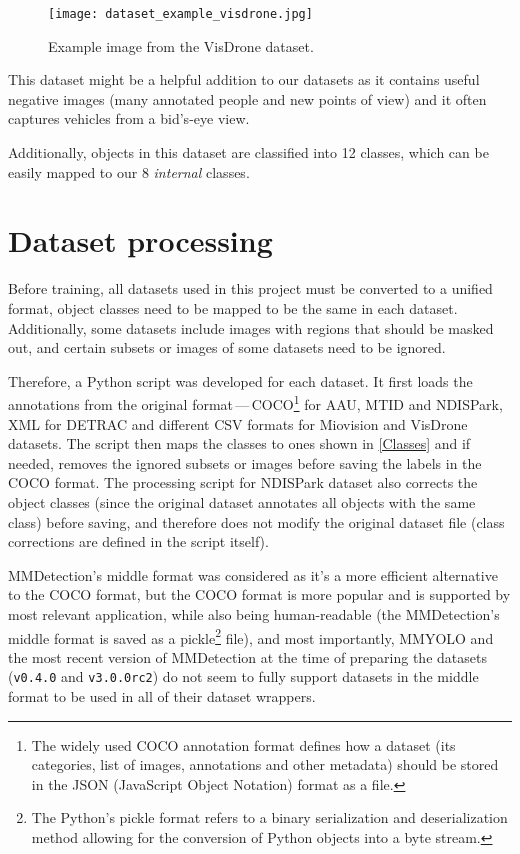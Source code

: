 
\begin{figure}[h]
    \centering
    \texttt{[image: dataset\_example\_visdrone.jpg]}
    \caption{Example image from the VisDrone dataset.}
    \label{VisDroneDatasetExample}
\end{figure}

This dataset might be a helpful addition to our datasets as it contains useful
negative images (many annotated people and new points of view) and it often
captures vehicles from a bid's-eye view.

Additionally, objects in this dataset are classified into 12 classes, which can
be easily mapped to our 8 \textit{internal} classes.


\section{Dataset processing}

Before training, all datasets used in this project must be converted to a
unified format, object classes need to be mapped to be the same in each dataset.
Additionally, some datasets include images with regions that should be masked
out, and certain subsets or images of some datasets need to be ignored.

Therefore, a Python script was developed for each dataset. It first loads the
annotations from the original format\,---\,COCO\footnote{The widely used COCO
annotation format defines how a dataset (its categories, list of images,
annotations and other metadata) should be stored in the JSON (JavaScript Object
Notation) format as a file.} for AAU, MTID
and NDISPark, XML for DETRAC and different CSV formats for Miovision and VisDrone datasets.
The script then maps the classes to ones shown in \autoref{Classes} and if
needed, removes the ignored subsets or images before saving the labels in the
COCO format. The processing script for NDISPark dataset also corrects the object
classes (since the original dataset annotates all objects with the same class)
before saving, and therefore does not modify the original dataset file (class
corrections are defined in the script itself).

MMDetection's middle format was considered as it's a more efficient alternative
to the COCO format, but the COCO format is more popular and is supported by most
relevant application, while also being human-readable (the MMDetection's middle
format is saved as a pickle\footnote{The Python's pickle format refers to a
binary serialization and deserialization method allowing for the conversion of
Python objects into a byte stream.} file), and most importantly, MMYOLO and the
most recent version of MMDetection at the time of preparing the datasets
(\texttt{v0.4.0} and \texttt{v3.0.0rc2}) do not seem to fully support datasets
in the middle format to be used in all of their dataset wrappers.

